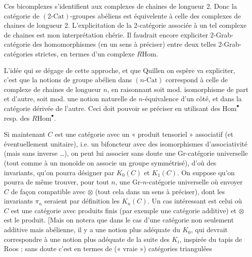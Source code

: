 \documentclass[11pt,a4paper]{article}
\begin{document}
Ces bicomplexes s'identifient aux complexes de chaines de longueur 2. Donc
la catégorie de $(2\text{-Cat})$-groupes abéliens est équivelente à celle
des complexes de chaines de longueur 2. L'explicitation de la 2-catégorie
associée à un tel complexe de chaines est mon interprétation chérie. Il
faudrait encore expliciter 2-Grab-catégorie des homomorphismes (en un sens
à préciser) entre deux telles 2-Grab-catégories strictes, en termes d'un
complexe $R\mathrm{Hom}$.

L'idée qui se dégage de cette approche, et que Quillen on espère va
expliciter, c'est que la notions de groupe abélien dans
$(n\text{-Cat})$ correspond à celle de complexe de chaines de
longueur $n$, en raisonnant soit mod. isomorphisme de part et d'autre, soit
mod. une notion naturelle de $n$-équivalence d'un côté, et dans la
catégorie dérivée de l'autre. Ceci doit pouvoir se préciser en utilisant
des $\mathrm{Hom}^{\bullet}$ resp. des $R\mathrm{Hom}^{\bullet}$.

Si maintenant $C$ est une catégorie avec un « produit tensoriel »
associatif (et éventuellement unitaire), i.e. un bifoncteur avec des
isomorphismes d'associativité (mais sans inverse …), on peut lui associer
sans doute une Gr-catégorie universelle (tout comme à un monoïde on associe
un groupe symmétrisé), d'où des invariants, qu'on pourra désigner par
$K_0(C)$ et $K_1(C)$. On suppose qu'on pourra de même trouver, pour tout
$n$, une Gr-$n$-catégorie universelle où envoyer $C$ de façon compatible
avec $\otimes$ (tout cela dans un sens à préciser), dont les invariants
$\pi_n$ seraient par définition les $K_n(C)$. Un cas intéressant est celui
où $C$ est une catégorie avec produits finis (par exemple une catégorie
additive) et $\otimes$ est le produit. [Mais on notera que dans le cas
d'une catégorie non seulement additive mais abélienne, il y a une notion
plus adéquate du $K_0$, qui devrait correspondre à une notion plus adéquate
de la suite des $K_i$, inspirée du tapis de Roos ; sans doute c'est en
termes de (« vraie ») catégories triangulées
\end{document}
